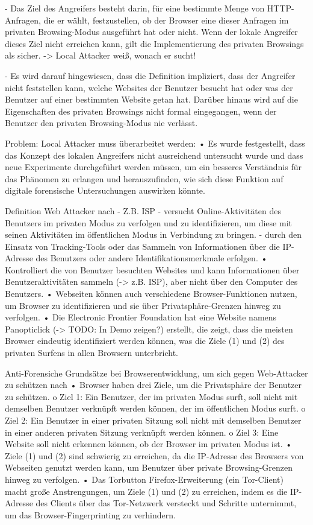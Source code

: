 	-	Das Ziel des Angreifers besteht darin, für eine bestimmte Menge von HTTP-Anfragen, die er wählt, festzustellen, ob der Browser eine dieser Anfragen im privaten Browsing-Modus ausgeführt hat oder nicht. Wenn der lokale Angreifer dieses Ziel nicht erreichen kann, gilt die Implementierung des privaten Browsings als sicher.
	-> Local Attacker weiß, wonach er sucht!
	
	- Es wird darauf hingewiesen, dass die Definition impliziert, dass der Angreifer nicht feststellen kann, welche Websites der Benutzer besucht hat oder was der Benutzer auf einer bestimmten Website getan hat. Darüber hinaus wird auf die Eigenschaften des privaten Browsings nicht formal eingegangen, wenn der Benutzer den privaten Browsing-Modus nie verlässt.

Problem: Local Attacker muss überarbeitet werden: \cite{Montasari.2015}
	•	Es wurde festgestellt, dass das Konzept des lokalen Angreifers nicht ausreichend untersucht wurde und dass neue Experimente durchgeführt werden müssen, um ein besseres Verständnis für das Phänomen zu erlangen und herauszufinden, wie sich diese Funktion auf digitale forensische Untersuchungen auswirken könnte.


Definition Web Attacker nach \cite{Aggarwal.2010}
	-	Z.B. ISP
	-	versucht Online-Aktivitäten des Benutzers im privaten Modus zu verfolgen und zu identifizieren, um diese mit seinen Aktivitäten im öffentlichen Modus in Verbindung zu bringen. 
	-	durch den Einsatz von Tracking-Tools oder das Sammeln von Informationen über die IP-Adresse des Benutzers oder andere Identifikationsmerkmale erfolgen. 
	•	Kontrolliert die von Benutzer besuchten Websites und kann Informationen über Benutzeraktivitäten sammeln (-> z.B. ISP), aber nicht über den Computer des Benutzers.
	•	Webseiten können auch verschiedene Browser-Funktionen nutzen, um Browser zu identifizieren und sie über Privatsphäre-Grenzen hinweg zu verfolgen.
	•	Die Electronic Frontier Foundation hat eine Website namens Panopticlick (-> TODO: In Demo zeigen?) erstellt, die zeigt, dass die meisten Browser eindeutig identifiziert werden können, was die Ziele (1) und (2) des privaten Surfens in allen Browsern unterbricht.
	
	
Anti-Forensiche Grundsätze bei Browserentwicklung, um sich gegen Web-Attacker zu schützen nach \cite{Aggarwal.2010}
	•	Browser haben drei Ziele, um die Privatsphäre der Benutzer zu schützen.
		o	Ziel 1: Ein Benutzer, der im privaten Modus surft, soll nicht mit demselben Benutzer verknüpft werden können, der im öffentlichen Modus surft.
		o	Ziel 2: Ein Benutzer in einer privaten Sitzung soll nicht mit demselben Benutzer in einer anderen privaten Sitzung verknüpft werden können.
		o	Ziel 3: Eine Website soll nicht erkennen können, ob der Browser im privaten Modus ist.
	•	Ziele (1) und (2) sind schwierig zu erreichen, da die IP-Adresse des Browsers von Webseiten genutzt werden kann, um Benutzer über private Browsing-Grenzen hinweg zu verfolgen.
	•	Das Torbutton Firefox-Erweiterung (ein Tor-Client) macht große Anstrengungen, um Ziele (1) und (2) zu erreichen, indem es die IP-Adresse des Clients über das Tor-Netzwerk versteckt und Schritte unternimmt, um das Browser-Fingerprinting zu verhindern.
	

